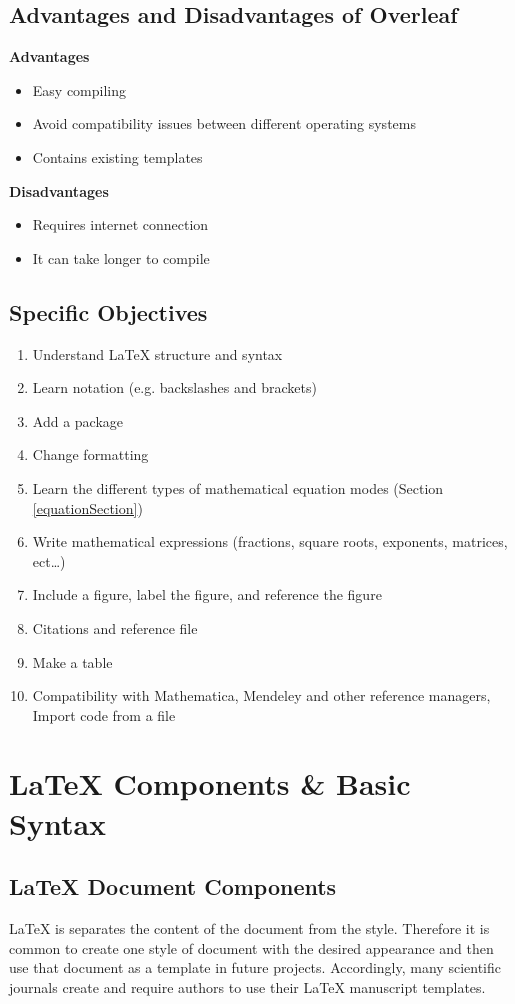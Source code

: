 \documentclass{article}
\begin{document}
\subsection{Advantages and Disadvantages of Overleaf}
\textbf{Advantages}
\begin{itemize}
    \item Easy compiling 
    \item Avoid compatibility issues between different operating systems 
    \item Contains existing templates
\end{itemize}
\textbf{Disadvantages}
\begin{itemize}
    \item Requires internet connection 
    \item It can take longer to compile 
\end{itemize}
\subsection{Specific Objectives}
\begin{enumerate}
    \item Understand LaTeX structure and syntax
    \item Learn notation (e.g. backslashes and brackets)
    \item Add a package 
    \item Change formatting 
    \item Learn the different types of mathematical equation modes (Section \ref{equationSection})
    \item Write mathematical expressions (fractions, square roots, exponents, matrices, ect…) 
    \item Include a figure, label the figure, and reference the figure 
    \item Citations and reference file
    \item Make a table 
    \item Compatibility with Mathematica, Mendeley and other reference managers, Import code from a file 
\end{enumerate}
\newpage
\section{LaTeX Components \& Basic Syntax}

\subsection{LaTeX Document Components}
LaTeX is separates the content of the document from the style. Therefore it is common to create one style of document with the desired appearance and then use that document as a template in future projects. Accordingly, many scientific journals create and require authors to use their LaTeX manuscript templates. \\
\end{document}
